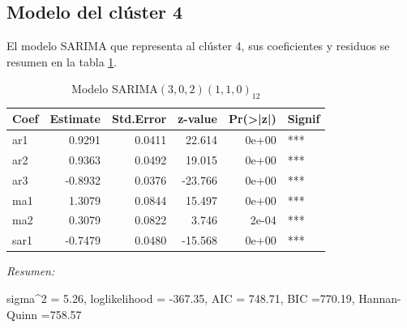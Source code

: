 \documentclass[12pt,oneside]{book}\usepackage[]{graphicx}\usepackage[]{color}
\newenvironment{knitrout}{}{} %
\theoremstyle{definition} %
\begin{document}
\subsection{Modelo del clúster 4}


El modelo SARIMA que representa al clúster 4, sus coeficientes y residuos se resumen en la tabla \ref{tab:sarima_cl4}.



\begin{knitrout}
\color{fgcolor}\begin{table}

\caption{\label{tab:unnamed-chunk-92}\label{tab:sarima_cl4}Modelo SARIMA$(3,0,2)(1,1,0)_{12}$}
\centering
\begin{threeparttable}
\begin{tabular}[t]{lrrrrl}
\toprule
Coef & Estimate & Std.Error & z-value & Pr(>|z|) & Signif\\
\midrule
\rowcolor{gray!6}  ar1 & 0.9291 & 0.0411 & 22.614 & 0e+00 & ***\\
ar2 & 0.9363 & 0.0492 & 19.015 & 0e+00 & ***\\
\rowcolor{gray!6}  ar3 & -0.8932 & 0.0376 & -23.766 & 0e+00 & ***\\
ma1 & 1.3079 & 0.0844 & 15.497 & 0e+00 & ***\\
\rowcolor{gray!6}  ma2 & 0.3079 & 0.0822 & 3.746 & 2e-04 & ***\\
\addlinespace
sar1 & -0.7479 & 0.0480 & -15.568 & 0e+00 & ***\\
\bottomrule
\end{tabular}
\begin{tablenotes}
\item \textit{Resumen:} 
\item sigma\textasciicircum{}2 = 5.26, loglikelihood = -367.35, AIC = 748.71, BIC =770.19, Hannan-Quinn =758.57
\end{tablenotes}
\end{threeparttable}
\end{table}


\end{knitrout}
\end{document}
